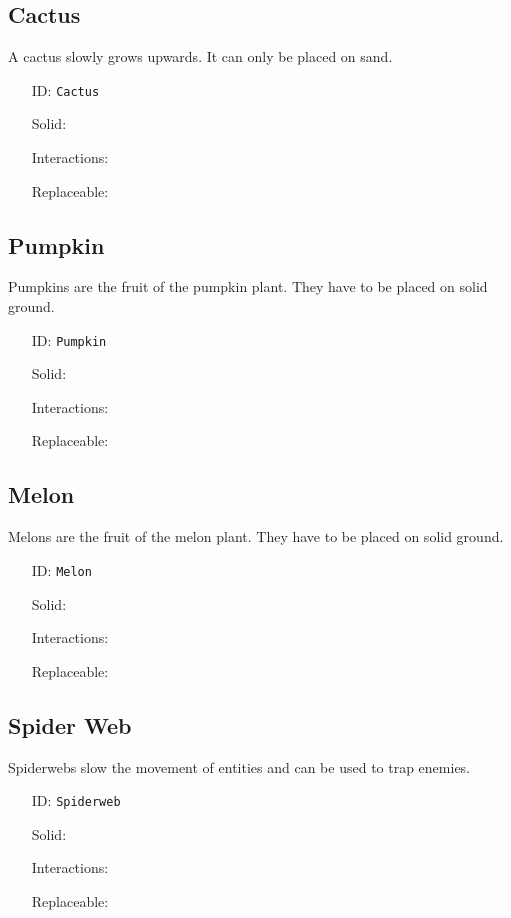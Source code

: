 \subsection{Cactus}\label{subsec:blocks_cactus}
A cactus slowly grows upwards. It can only be placed on sand.
\newline
\begin{itemize}[nosep]
    \item[ID:] \texttt{Cactus}
    \item[Solid:]  \Checkmark \item[Interactions:]  \XSolidBrush \item[Replaceable:]  \XSolidBrush
\end{itemize}

\subsection{Pumpkin}\label{subsec:blocks_pumpkin}
Pumpkins are the fruit of the pumpkin plant. They have to be placed on solid ground.
\newline
\begin{itemize}[nosep]
    \item[ID:] \texttt{Pumpkin}
    \item[Solid:]  \Checkmark \item[Interactions:]  \XSolidBrush \item[Replaceable:]  \XSolidBrush
\end{itemize}

\subsection{Melon}\label{subsec:blocks_melon}
Melons are the fruit of the melon plant. They have to be placed on solid ground.
\newline
\begin{itemize}[nosep]
    \item[ID:] \texttt{Melon}
    \item[Solid:]  \Checkmark \item[Interactions:]  \XSolidBrush \item[Replaceable:]  \XSolidBrush
\end{itemize}

\subsection{Spider Web}\label{subsec:blocks_spider web}
Spiderwebs slow the movement of entities and can be used to trap enemies.
\newline
\begin{itemize}[nosep]
    \item[ID:] \texttt{Spiderweb}
    \item[Solid:]  \XSolidBrush \item[Interactions:]  \XSolidBrush \item[Replaceable:]  \XSolidBrush
\end{itemize}

